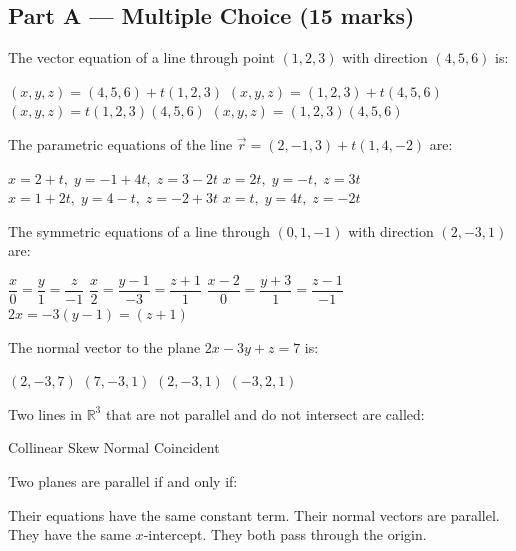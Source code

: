 \documentclass[addpoints]{exam}
\begin{document}
\newpage
\begin{questions}

\section*{Part A --- Multiple Choice (15 marks)}
\vspace{5mm}

\question[1] The vector equation of a line through point $(1,2,3)$ with direction $(4,5,6)$ is:
\begin{choices}
    \choice $(x,y,z) = (4,5,6) + t(1,2,3)$
    \correctchoice $(x,y,z) = (1,2,3) + t(4,5,6)$
    \choice $(x,y,z) = t(1,2,3)(4,5,6)$
    \choice $(x,y,z) = (1,2,3)(4,5,6)$
\end{choices}

\question[1] The parametric equations of the line $\vec{r} = (2,-1,3) + t(1,4,-2)$ are:
\begin{choices}
    \correctchoice $x = 2+t,\; y = -1+4t,\; z = 3-2t$
    \choice $x = 2t,\; y = -t,\; z = 3t$
    \choice $x = 1+2t,\; y = 4-t,\; z = -2+3t$
    \choice $x = t,\; y = 4t,\; z = -2t$
\end{choices}

\question[1] The symmetric equations of a line through $(0,1,-1)$ with direction $(2,-3,1)$
are:
\begin{choices}
    \choice $\dfrac{x}{0} = \dfrac{y}{1} = \dfrac{z}{-1}$
    \correctchoice $\dfrac{x}{2} = \dfrac{y-1}{-3} = \dfrac{z+1}{1}$
    \choice $\dfrac{x-2}{0} = \dfrac{y+3}{1} = \dfrac{z-1}{-1}$
    \choice $2x = -3(y-1) = (z+1)$
\end{choices}

\question[1] The normal vector to the plane $2x - 3y + z = 7$ is:
\begin{choices}
    \choice $(2,-3,7)$
    \choice $(7,-3,1)$
    \correctchoice $(2,-3,1)$
    \choice $(-3,2,1)$
\end{choices}

\question[1] Two lines in $\mathbb{R}^3$ that are not parallel and do not intersect are called:
\begin{choices}
    \choice Collinear
    \correctchoice Skew
    \choice Normal
    \choice Coincident
\end{choices}

\question[1] Two planes are parallel if and only if:
\begin{choices}
    \choice Their equations have the same constant term.
    \correctchoice Their normal vectors are parallel.
    \choice They have the same $x$-intercept.
    \choice They both pass through the origin.
\end{choices}


\end{questions}
\end{document}
